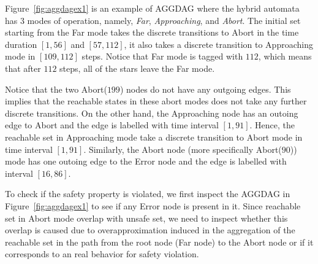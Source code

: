 \begin{example}
Figure~\ref{fig:aggdagex1} is an example of AGGDAG where the hybrid automata has 3 modes of operation, namely, {\em Far}, {\em Approaching}, and {\em Abort}. The initial set starting from the Far mode takes the discrete transitions to Abort in the time duration $[1,56]$ and $[57,112]$, it also takes a discrete transition to Approaching mode in $[109,112]$ steps. Notice that Far mode is tagged with $112$, which means that after $112$ steps, all of the stars leave the Far mode. 

Notice that the two Abort($199$) nodes do not have any outgoing edges. This implies that the reachable states in these abort modes does not take any further discrete transitions. On the other hand, the Approaching node has an outoing edge to Abort and the edge is labelled with time interval $[1,91]$. Hence, the reachable set in Approaching mode take a discrete transition to Abort mode in time interval $[1,91]$. Similarly, the Abort node (more specifically Abort($90$)) mode has one outoing edge to the Error node and the edge is labelled with interval $[16,86]$.

To check if the safety property is violated, we first inspect the AGGDAG in Figure~\ref{fig:aggdagex1} to see if any Error node is present in it. Since reachable set in Abort mode overlap with unsafe set, we need to inspect whether this overlap is caused due to overapproximation induced in the aggregation of the reachable set in the path from the root node (Far node) to the Abort node or if it corresponds to an real behavior for safety violation. 


\end{example}
